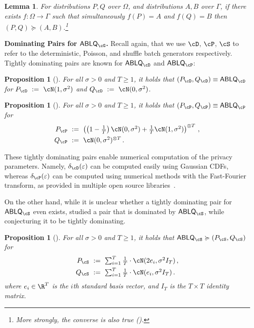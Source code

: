 \documentclass[twoside]{article}
\newtheorem{lemma}[theorem]{Lemma}
\newtheorem{proposition}[theorem]{Proposition}
\theoremstyle{definition}
\newcommand{\eps}{\varepsilon}
\newcommand{\prn}[1]{\left ( #1 \right )}
\newcommand{\ABLQ}{\mathsf{ABLQ}}
\newcommand{\ABLQG}{\ABLQ_{\cG}}
\newcommand{\ABLQD}{\ABLQ_{\cD}}
\newcommand{\ABLQP}{\ABLQ_{\cP}}
\newcommand{\ABLQS}{\ABLQ_{\cS}}
\newcommand{\deltaD}{\delta_{\cD}}
\newcommand{\deltaP}{\delta_{\cP}}
\newcommand{\PD}{P_{\cD}}
\newcommand{\QD}{Q_{\cD}}
\newcommand{\PS}{P_{\cS}}
\newcommand{\QS}{Q_{\cS}}
\newcommand{\PP}{P_{\cP}}
\newcommand{\QP}{Q_{\cP}}
\newcommand{\dominates}{\succcurlyeq}%
\begin{document}
\begin{lemma}\label{lem:post-process-and-domination}
For distributions $P, Q$ over $\Omega$, and distributions $A, B$ over $\Gamma$, if there exists $f : \Omega \to \Gamma$ such that simultaneously $f(P) = A$ and $f(Q) = B$ then $(P, Q) \dominates (A, B)$.\footnote{More strongly, the converse is also true ().}
\end{lemma}

{\bf \boldmath Dominating Pairs for $\ABLQG$.}
Recall again, that we use $\cD$, $\cP$, $\cS$ to refer to the deterministic, Poisson, and shuffle batch generators respectively.
Tightly dominating pairs are known for $\ABLQD$ and $\ABLQP$:

\begin{proposition}[{\citet[Theorem 8]{balle18improving}}]\label{prop:D-hockey}
For all $\sigma > 0$ and $T \ge 1$, it holds that $(\PD, \QD) \equiv \ABLQD$ for
$\PD \textstyle~:=~ \cN(1, \sigma^2)$ and $\QD \textstyle~:=~ \cN(0, \sigma^2)$.
\end{proposition}

\begin{proposition}[\cite{koskela2020computing,zhu22optimal}]\label{prop:P-dominating}
For all $\sigma > 0$ and $T \ge 1$, it holds that $(\PP, \QP) \equiv \ABLQP$ for
\begin{align*}
\PP &\textstyle~:=~ \prn{\prn{1 - \frac1T} \cN(0, \sigma^2) + \frac1T \cN(1, \sigma^2)}^{\otimes T}\,,\\
\QP &\textstyle~:=~ \cN(0, \sigma^2)^{\otimes T}\,.
\end{align*}
\end{proposition}
These tightly dominating pairs enable numerical computation of the privacy parameters. Namely, $\deltaD(\eps)$ can be computed easily using Gaussian CDFs, whereas $\deltaP(\eps)$ can be computed using numerical methods with the Fast-Fourier transform, as provided in multiple open source libraries~\citep{DPBayes,MicrosoftDP,GoogleDP}.

On the other hand, while it is unclear whether a tightly dominating pair for $\ABLQS$ even exists, \cite{chua24private} studied a pair that is dominated by $\ABLQS$, while conjecturing it to be tightly dominating.
\begin{proposition}[\cite{chua24private}]\label{prop:S-dominated}
For all $\sigma > 0$ and $T \ge 1$, it holds that $\ABLQS \dominates (\PS, \QS)$ for
\begin{align*}
\PS &\textstyle~:=~ \sum_{i=1}^T \frac1T \cdot \cN(2e_i, \sigma^2 I_T)\,,\\
\QS &\textstyle~:=~ \sum_{i=1}^T \frac1T \cdot \cN(e_i, \sigma^2 I_T)\,.
\end{align*}
where $e_i \in \R^T$ is the $i$th standard basis vector, and $I_T$ is the $T \times T$ identity matrix.
\end{proposition}
\end{document}
